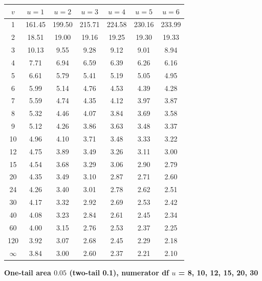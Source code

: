 \begin{center}
\small
\begin{tabular}{c|cccccc}
\toprule
$v$ & $u=1$ & $u=2$ & $u=3$ & $u=4$ & $u=5$ & $u=6$ \\
\midrule
1 & 161.45 & 199.50 & 215.71 & 224.58 & 230.16 & 233.99 \\
2 & 18.51 & 19.00 & 19.16 & 19.25 & 19.30 & 19.33 \\
3 & 10.13 & 9.55 & 9.28 & 9.12 & 9.01 & 8.94 \\
4 & 7.71 & 6.94 & 6.59 & 6.39 & 6.26 & 6.16 \\
5 & 6.61 & 5.79 & 5.41 & 5.19 & 5.05 & 4.95 \\
6 & 5.99 & 5.14 & 4.76 & 4.53 & 4.39 & 4.28 \\
7 & 5.59 & 4.74 & 4.35 & 4.12 & 3.97 & 3.87 \\
8 & 5.32 & 4.46 & 4.07 & 3.84 & 3.69 & 3.58 \\
9 & 5.12 & 4.26 & 3.86 & 3.63 & 3.48 & 3.37 \\
10 & 4.96 & 4.10 & 3.71 & 3.48 & 3.33 & 3.22 \\
12 & 4.75 & 3.89 & 3.49 & 3.26 & 3.11 & 3.00 \\
15 & 4.54 & 3.68 & 3.29 & 3.06 & 2.90 & 2.79 \\
20 & 4.35 & 3.49 & 3.10 & 2.87 & 2.71 & 2.60 \\
24 & 4.26 & 3.40 & 3.01 & 2.78 & 2.62 & 2.51 \\
30 & 4.17 & 3.32 & 2.92 & 2.69 & 2.53 & 2.42 \\
40 & 4.08 & 3.23 & 2.84 & 2.61 & 2.45 & 2.34 \\
60 & 4.00 & 3.15 & 2.76 & 2.53 & 2.37 & 2.25 \\
120 & 3.92 & 3.07 & 2.68 & 2.45 & 2.29 & 2.18 \\
$\infty$ & 3.84 & 3.00 & 2.60 & 2.37 & 2.21 & 2.10 \\
\bottomrule
\end{tabular}
\end{center}

\textbf{One-tail area $0.05$ (two-tail 0.1), numerator df $u$ = 8, 10, 12, 15, 20, 30}

